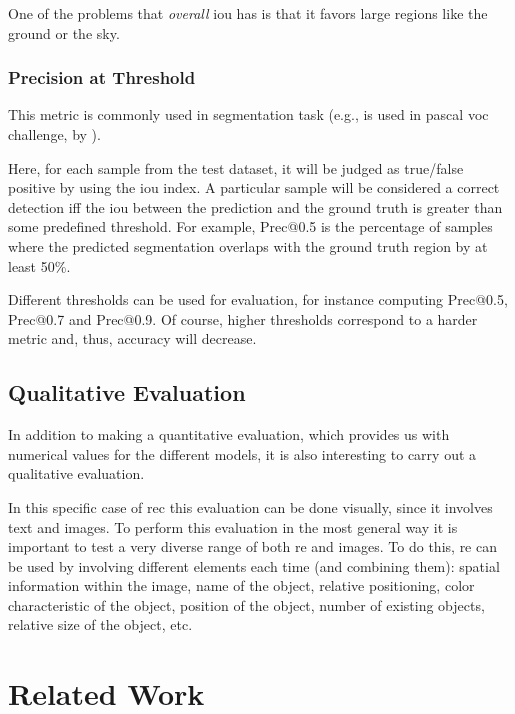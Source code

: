 One of the problems that \emph{overall} \gls{iou} has is that it favors
large regions like the ground or the sky.

\subsubsection{Precision at Threshold}

This metric is commonly used in segmentation task (e.g., is used in
\acs{pascal} \gls{voc} challenge, by
).

Here, for each sample from the test dataset, it will be judged as true/false
positive by using the \gls{iou} index. A particular sample will be considered a
correct detection iff the \gls{iou} between the prediction and the ground truth
is greater than some predefined threshold. For example, Prec@0.5 is the
percentage of samples where the predicted segmentation overlaps with the ground
truth region by at least 50\%.

Different thresholds can be used for evaluation, for instance computing
Prec@0.5, Prec@0.7 and Prec@0.9. Of course, higher thresholds correspond to
a harder metric and, thus, accuracy will decrease.


\subsection{Qualitative Evaluation}\label{sec:qualitative-eval}

In addition to making a quantitative evaluation, which provides us with
numerical values for the different models, it is also interesting to carry out
a qualitative evaluation.

In this specific case of \gls{rec} this evaluation can be done visually, since
it involves text and images. To perform this evaluation in the most general way
it is important to test a very diverse range of both \gls{re} and images. To do
this, \gls{re} can be used by involving different elements each time (and
combining them): spatial information within the image, name of the object,
relative positioning, color characteristic of the object, position of the
object, number of existing objects, relative size of the object, etc.



\section{Related Work}\label{sec:sota}

